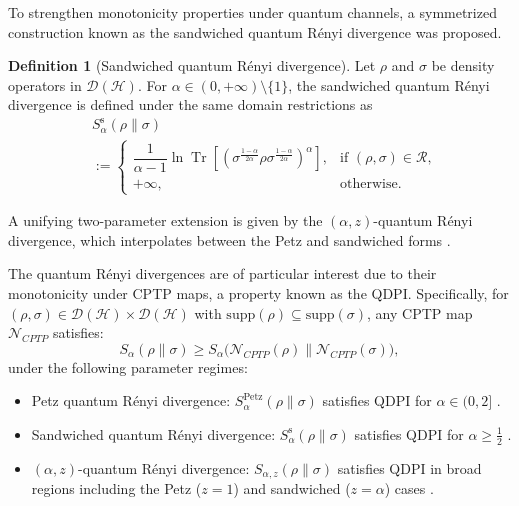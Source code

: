 \documentclass[a4paper, amsfonts, amssymb, amsmath, reprint, showkeys, nofootinbib, twoside, aps, pra]{revtex4-2}
\theoremstyle{definition}
\newtheorem{definition}{Definition}
\begin{document}
To strengthen monotonicity properties under quantum channels, a symmetrized construction known as the sandwiched quantum Rényi divergence was proposed.

\begin{definition}[Sandwiched quantum Rényi divergence]
   Let $\rho$ and $\sigma$ be density operators in $\mathcal{D}(\mathcal{H})$. For $\alpha \in (0,+\infty)\setminus\{1\}$, the sandwiched quantum Rényi divergence is defined under the same domain restrictions as
\begin{equation}
\begin{split}
    &S_{\alpha}^{\mathrm{s}}(\rho \parallel \sigma) \\
    &:= \begin{cases} 
        \dfrac{1}{\alpha - 1} \ln \operatorname{Tr}\!\left[ \left( \sigma^{\frac{1-\alpha}{2\alpha}} \rho \sigma^{\frac{1-\alpha}{2\alpha}} \right)^{\!\alpha} \right], & \text{if } (\rho, \sigma) \in \mathcal{R}, \\
        +\infty, & \text{otherwise.}
    \end{cases}
\end{split}
\label{eq:sandwiched}
\end{equation}

\end{definition}
A unifying two-parameter extension is given by the $(\alpha,z)$-quantum Rényi divergence,
which interpolates between the Petz and sandwiched forms \cite{audenaert2015alphaZ}.

The quantum Rényi divergences are of particular interest due to their monotonicity under CPTP maps, a property known as the QDPI. Specifically, for $(\rho,\sigma )\in \mathcal{D}(\mathcal{H}) \times \mathcal{D}(\mathcal{H})$ with $\mathrm{supp}(\rho)\subseteq\mathrm{supp}(\sigma)$, any CPTP map $\mathcal{N}_{CPTP}$ satisfies:
\begin{equation}
    S_{\alpha}(\rho \| \sigma) \ge S_{\alpha}\bigl(\mathcal{N}_{CPTP}(\rho)\| \mathcal{N}_{CPTP}(\sigma)\bigr),
\end{equation}
under the following parameter regimes:
\begin{itemize}
    \item  {Petz quantum Rényi divergence:} $S_{\alpha}^{\mathrm{Petz}}(\rho \| \sigma)$ satisfies QDPI for $\alpha\in(0,2]$ \cite{Tomamichel2016,Li2024}.
    \item {Sandwiched quantum Rényi divergence:} $S_{\alpha}^{\mathrm{s}}(\rho \|\sigma)$ satisfies QDPI for $\alpha\ge \tfrac{1}{2}$ \cite{frank2013,Beigi2013,Wilde2014}.
    \item {$(\alpha,z)$-quantum Rényi divergence:} $S_{\alpha,z}(\rho \| \sigma)$ satisfies QDPI in broad regions including the Petz ($z=1$) and sandwiched ($z=\alpha$) cases \cite{audenaert2015alphaZ}.
\end{itemize}
\end{document}
